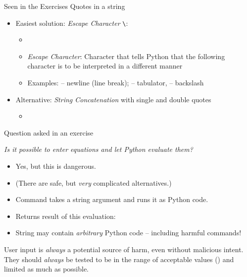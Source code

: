 
\begin{frame}[fragile]{Seen in the Exercises}
%
Quotes in a string
\begin{itemize}
\item Easiest solution: \emph{Escape Character} \texttt{\textbackslash}:
	\begin{itemize}
	\item {}
	\item \emph{Escape Character}: Character that tells Python that the following character is to be interpreted in a different manner
	\item Examples:  -- newline (line break);  -- tabulator,  -- backslash
	\end{itemize}
\item Alternative: \emph{String Concatenation} with single and double quotes
	\begin{itemize}
	\item {}
	\end{itemize}
\end{itemize}
%
\end{frame}


\begin{frame}[fragile]{Question asked in an exercise}
%
\begin{center}
	\begin{Large}
	\emph{Is it possible to enter equations and let Python evaluate them?}
	\end{Large}
\end{center}
%
\begin{itemize}
\item Yes, but this is dangerous.
\item (There are safe, but \emph{very} complicated alternatives.)
\item Command  takes a string argument and runs it as Python code.
\item Returns result of this evaluation: 
\item String may contain \emph{arbitrary} Python code -- including harmful commands!
\end{itemize}
%
\begin{warnbox}
User input is \emph{always} a potential source of harm, even without malicious intent. They should \emph{always} be tested to be in the range of acceptable values (\Thus {}) and limited as much as possible.
\end{warnbox}
%
\end{frame}

